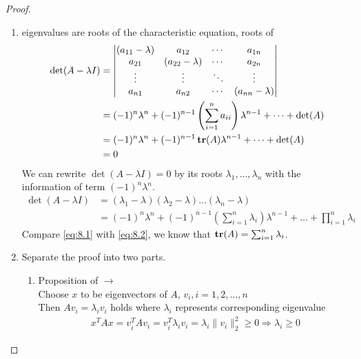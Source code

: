 \documentclass[12pt]{extarticle}
\theoremstyle{definition}
\begin{document}
\begin{proof}
  $ $
  \begin{enumerate}[label=(\alph*)]
    \item eigenvalues are roots of the characteristic equation, \ie roots of
      \begin{align}
        \det(A-\lambda I)
          & = \begin{vmatrix}
                (a_{11}-\lambda) & a_{12} & \cdots & a_{1n}\\
                a_{21} & (a_{22}-\lambda) & \cdots & a_{2n}\\
                \vdots & \vdots & \ddots & \vdots \\
                a_{n1} & a_{n2} & \cdots & (a_{nn} - \lambda)
              \end{vmatrix}\nonumber\\
          & = (-1)^n\lambda^n+(-1)^{n-1}\left(\sum_{i=1}^na_{ii}\right)\lambda^{n-1}+\dots+\det(A)\nonumber\\
          & = (-1)^n\lambda^n+(-1)^{n-1}\mathop{\bf tr}(A)\lambda^{n-1}+\dots+\det(A)\label{eq:8.1}\\
          & = 0\nonumber
      \end{align}
      We can rewrite $\det(A-\lambda I)=0$ by its roots $\lambda_1,\dots,\lambda_n$ with the information of term $(-1)^n\lambda^n$.
      \begin{align}
        \det(A-\lambda I)
          & = (\lambda_1-\lambda)(\lambda_2-\lambda)\dots(\lambda_n-\lambda)\nonumber\\
          & = (-1)^n\lambda^n+(-1)^{n-1}\left(\sum_{i=1}^n\lambda_i\right)\lambda^{n-1}+\dots+\prod_{i=1}^n\lambda_i\label{eq:8.2}
      \end{align}
      Compare \eqref{eq:8.1} with \eqref{eq:8.2}, we know that $\mathop{\bf tr}(A)=\sum_{i=1}^n\lambda_i$.      
    \item Separate the proof into two parts.
      \begin{enumerate}[label=(\roman*)]
        \item Proposition of $\rightarrow$\\
          Choose $x$ to be eigenvectors of $A$, \ie $v_i, i=1,2,\dots,n$\\
          Then $Av_i=\lambda_iv_i$ holds where $\lambda_i$ represents corresponding eigenvalue
          \begin{align*}
            x^TAx=v_i^TAv_i=v_i^T\lambda_iv_i=\lambda_i\|v_i\|_2^2\ge 0 \Rightarrow \lambda_i \ge 0
          \end{align*}

\end{enumerate}
\end{enumerate}
\end{proof}
\end{document}
